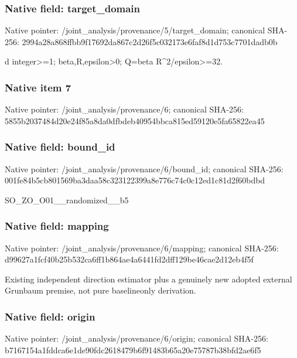 \documentclass[10pt,a4paper]{article}
\begin{document}
\subsubsection{Native field: target\_domain}


Native pointer: /joint\_analysis/provenan\allowbreak{}ce/5/target\_domain; canonical SHA-256: 2994a28a868ffbb9f17692da\allowbreak{}867c2d26f5c032173e6faf8d\allowbreak{}1d753c7701dadb0b


d integer>=1; beta,R,epsilon>0; Q=beta R\textasciicircum{}2/epsilon>=32.


\subsubsection{Native item 7}


Native pointer: /joint\_analysis/provenance/6; canonical SHA-256: 5855b2037484d20e24f85a8d\allowbreak{}a0dfbdeb40954bbca815ed59\allowbreak{}120e5fa65822ea45



\subsubsection{Native field: bound\_id}


Native pointer: /joint\_analysis/provenance/6/bound\_id; canonical SHA-256: 001fe84b5cb801569ba3daa5\allowbreak{}8c323122399a8e776c74c0c1\allowbreak{}2ed1c81d2f60bdbd


SO\_ZO\_O01\_\_randomized\_\_b5


\subsubsection{Native field: mapping}


Native pointer: /joint\_analysis/provenance/6/mapping; canonical SHA-256: d99627a1fcf40b25b532ca6f\allowbreak{}f1b864ae4a6441fd2dff129b\allowbreak{}e46cae2d12eb4f5f


Existing independent direction estimator plus a genuinely new adopted external Grunbaum premise, not pure baselineonly derivation.


\subsubsection{Native field: origin}


Native pointer: /joint\_analysis/provenance/6/origin; canonical SHA-256: b7167154a1fddca6e1de90fd\allowbreak{}c2618479b6f91483b65a20e7\allowbreak{}5787b38bfd2ae6f5
\end{document}
